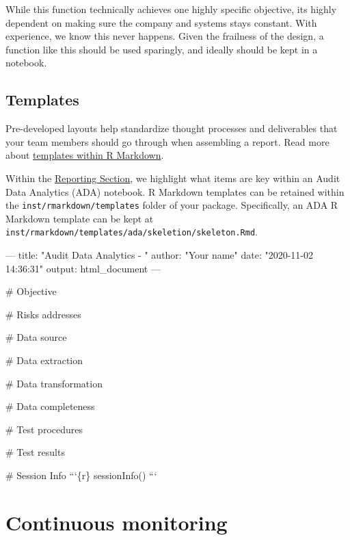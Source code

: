 \documentclass[
]{book}
\newenvironment{Shaded}{\begin{snugshade}}{\end{snugshade}}
\newcommand{\BaseNTok}[1]{\textcolor[rgb]{0.00,0.00,0.81}{#1}}
\newcommand{\FunctionTok}[1]{\textcolor[rgb]{0.00,0.00,0.00}{#1}}
\newcommand{\NormalTok}[1]{#1}
\begin{document}
While this function technically achieves one highly specific objective, its highly dependent on making sure the company and systems stays constant. With experience, we know this never happens. Given the frailness of the design, a function like this should be used sparingly, and ideally should be kept in a notebook.

\hypertarget{templates}{%
\section{Templates}\label{templates}}

Pre-developed layouts help standardize thought processes and deliverables that your team members should go through when assembling a report. Read more about \href{https://bookdown.org/yihui/rmarkdown-cookbook/package-template.html}{templates within R Markdown}.

Within the \protect\hyperlink{report-structure}{Reporting Section}, we highlight what items are key within an Audit Data Analytics (ADA) notebook. R Markdown templates can be retained within the \texttt{inst/rmarkdown/templates} folder of your package. Specifically, an ADA R Markdown template can be kept at \texttt{inst/rmarkdown/templates/ada/skeletion/skeleton.Rmd}.

\begin{Shaded}
\begin{Highlighting}[]
\NormalTok{---}
\NormalTok{title: "Audit Data Analytics - "}
\NormalTok{author: "Your name"}
\NormalTok{date: "2020-11-02 14:36:31"}
\NormalTok{output:}
\NormalTok{  html_document}
\NormalTok{---}

\FunctionTok{# Objective}

\FunctionTok{# Risks addresses}

\FunctionTok{# Data source}

\FunctionTok{# Data extraction}

\FunctionTok{# Data transformation}

\FunctionTok{# Data completeness}

\FunctionTok{# Test procedures}

\FunctionTok{# Test results}

\FunctionTok{# Session Info}
\BaseNTok{```\{r\}}
\BaseNTok{sessionInfo()}
\BaseNTok{```}
\end{Highlighting}
\end{Shaded}

\hypertarget{continuous-monitoring}{%
\chapter{Continuous monitoring}\label{continuous-monitoring}}
\end{document}
